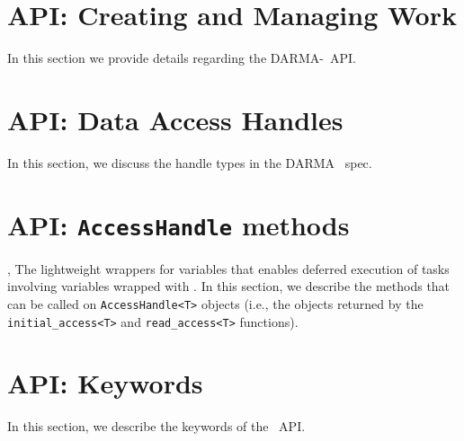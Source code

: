 
\lstMakeShortInline[style=CppCodeInlineStyle]{\|}

\section{API: Creating and Managing Work}
In this section we provide details regarding the DARMA-\specVersion\ \gls{API}.
\clearpage

\clearpage

\clearpage

\clearpage

\clearpage

\clearpage


\section{API: Data Access Handles}

In this section, we discuss the handle types in the DARMA \specVersion\ spec.

\clearpage

\clearpage

\section{API: \texttt{AccessHandle} methods}
,  The lightweight wrappers for variables that enables deferred execution of tasks involving variables wrapped with . 
In this section, we describe the methods that can be called 
on \texttt{AccessHandle<T>} objects (i.e., the objects returned by the 
\texttt{initial\_access<T>} and \texttt{read\_access<T>} functions).



\clearpage

\clearpage

\clearpage

\clearpage

\clearpage

\clearpage

\clearpage

\clearpage

\section{API: Keywords}

In this section, we describe the keywords of the \specVersion\ API. 


\clearpage

\clearpage


\lstDeleteShortInline{\|}
